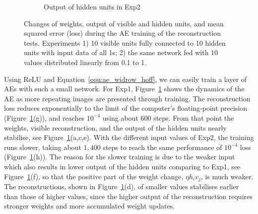 \begin{figure}
\begin{subfigure}[t]{0.48\textwidth}
		\caption{Output of hidden units in Exp2}
	\end{subfigure}
	\caption[AE training of the reconstruction tests.]{Changes of weights, output of visible and hidden units, and mean squared error (loss) during the AE training of the reconstruction tests. 
		Experiments 1) 10 visible units fully connected to 10 hidden units with input data of all 1s; 2) the same network fed with 10 values distributed linearly from 0.1 to 1.}
	\label{fig:ae_orig}
\end{figure}
Using ReLU and Equation~\ref{equ:ae_widrow_hoff}, we can easily train a layer of AEs with such a small network.
For Exp1, Figure~\ref{fig:ae_orig} shows the dynamics of the AE as more repeating images are presented through training.
The reconstruction loss reduces exponentially to the limit of the computer's floating-point precision (Figure~\ref{fig:ae_orig}(g)), and reaches $10^{-4}$ using about 600 steps.
From that point the weights, visible reconstruction, and the output of the hidden units nearly stabilise, see Figure~\ref{fig:ae_orig}(a,c,e).
With the different input values of Exp2, the training runs slower, taking about $1,400$ steps to reach the same performance of $10^{-4}$ loss (Figure~\ref{fig:ae_orig}(h)).
The reason for the slower training is due to the weaker input which also results in lower output of the hidden units comparing to Exp1, see Figure~\ref{fig:ae_orig}(f), so that the positive part of the weight change, $\eta h_i v_j$, is much weaker. 
The reconstructions, shown in Figure~\ref{fig:ae_orig}(d), of smaller values stabilises earlier than those of higher values, since the higher output of the reconstruction requires stronger weights and more accumulated weight updates. 
